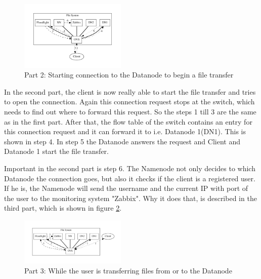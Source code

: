 \begin{figure}[htp]
\centering
\includegraphics[width=0.45\textwidth]{img/connectionToDatanode} 
\caption{Part 2: Starting connection to the Datanode to begin a file transfer}
\label{dn}
\end{figure}     

In the second part, the client is now really able to start the file transfer and tries to open the connection. Again this connection request stops at the switch, which needs to find out where to forward this request. So the steps 1 till 3 are the same as in the first part. After that, the flow table of the switch contains an entry for this connection request and it can forward it to i.e. Datanode 1(DN1). This is shown in step 4. In step 5 the Datanode answers the request and Client and Datanode 1 start the file transfer. 

Important in the second part is step 6. The Namenode not only decides to which Datanode the connection goes, but also it checks if the client is a registered user. If he is, the Namenode will send the username and the current IP with port of the user to the monitoring system "Zabbix". Why it does that, is described in the third part, which is shown in figure \ref{wc}.    

\begin{figure}[htp]
\centering
\includegraphics[width=0.45\textwidth]{img/whileConnection} 
\caption{Part 3: While the user is transferring files from or to the Datanode}
\label{wc}
\end{figure}

